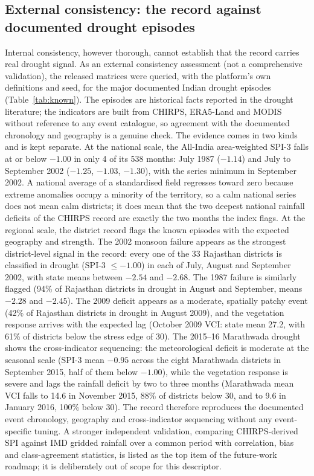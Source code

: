 \documentclass[10pt,a4paper]{article}
\begin{document}
\subsection*{External consistency: the record against documented drought episodes}
Internal consistency, however thorough, cannot establish that the record carries real drought signal. As an external consistency assessment (not a comprehensive validation), the released matrices were queried, with the platform's own definitions and seed, for the major documented Indian drought episodes (Table~\ref{tab:known}). The episodes are historical facts reported in the drought literature\citep{GadgilGadgil2006,Mallya2016}; the indicators are built from CHIRPS, ERA5-Land and MODIS without reference to any event catalogue, so agreement with the documented chronology and geography is a genuine check. The evidence comes in two kinds and is kept separate. At the national scale, the All-India area-weighted SPI-3 falls at or below $-1.00$ in only 4 of its 538 months: July 1987 ($-1.14$) and July to September 2002 ($-1.25$, $-1.03$, $-1.30$), with the series minimum in September 2002. A national average of a standardised field regresses toward zero because extreme anomalies occupy a minority of the territory, so a calm national series does not mean calm districts; it does mean that the two deepest national rainfall deficits of the CHIRPS record are exactly the two months the index flags. At the regional scale, the district record flags the known episodes with the expected geography and strength. The 2002 monsoon failure appears as the strongest district-level signal in the record: every one of the 33 Rajasthan districts is classified in drought (SPI-3 $\le -1.00$) in each of July, August and September 2002, with state means between $-2.54$ and $-2.68$. The 1987 failure is similarly flagged (94\% of Rajasthan districts in drought in August and September, means $-2.28$ and $-2.45$). The 2009 deficit appears as a moderate, spatially patchy event (42\% of Rajasthan districts in drought in August 2009), and the vegetation response arrives with the expected lag (October 2009 VCI: state mean 27.2, with 61\% of districts below the stress edge of 30). The 2015--16 Marathwada drought shows the cross-indicator sequencing: the meteorological deficit is moderate at the seasonal scale (SPI-3 mean $-0.95$ across the eight Marathwada districts in September 2015, half of them below $-1.00$), while the vegetation response is severe and lags the rainfall deficit by two to three months (Marathwada mean VCI falls to 14.6 in November 2015, 88\% of districts below 30, and to 9.6 in January 2016, 100\% below 30). The record therefore reproduces the documented event chronology, geography and cross-indicator sequencing without any event-specific tuning. A stronger independent validation, comparing CHIRPS-derived SPI against IMD gridded rainfall over a common period with correlation, bias and class-agreement statistics, is listed as the top item of the future-work roadmap; it is deliberately out of scope for this descriptor.
\end{document}
